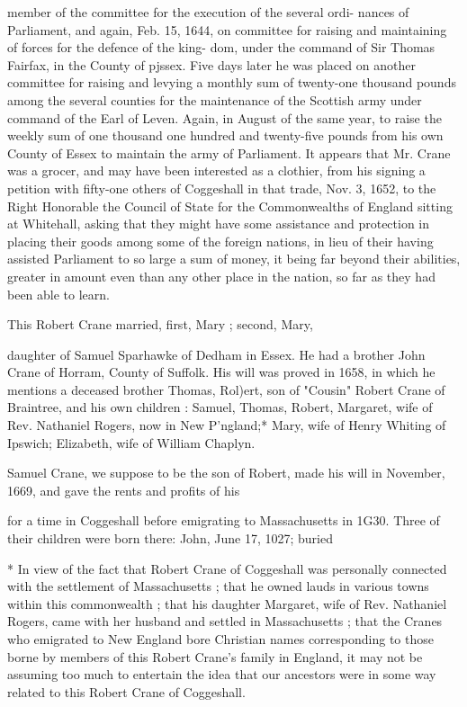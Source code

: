 \documentclass[oneside]{book}
\begin{document}
member of the committee for the execution of the several ordi- 
nances of Parliament, and again, Feb. 15, 1644, on committee 
for raising and maintaining of forces for the defence of the king- 
dom, under the command of Sir Thomas Fairfax, in the County 
of pjssex. Five days later he was placed on another committee 
for raising and levying a monthly sum of twenty-one thousand 
pounds among the several counties for the maintenance of the 
Scottish army under command of the Earl of Leven. Again, in 
August of the same year, to raise the weekly sum of one thousand 
one hundred and twenty-five pounds from his own County of 
Essex to maintain the army of Parliament. It appears that Mr. 
Crane was a grocer, and may have been interested as a clothier, 
from his signing a petition with fifty-one others of Coggeshall in 
that trade, Nov. 3, 1652, to the Right Honorable the Council of 
State for the Commonwealths of England sitting at Whitehall, 
asking that they might have some assistance and protection in 
placing their goods among some of the foreign nations, in lieu of 
their having assisted Parliament to so large a sum of money, it 
being far beyond their abilities, greater in amount even than any 
other place in the nation, so far as they had been able to learn. 

This Robert Crane married, first, Mary ; second, Mary, 

daughter of Samuel Sparhawke of Dedham in Essex. He had a 
brother John Crane of Horram, County of Suffolk. His will was 
proved in 1658, in which he mentions a deceased brother Thomas, 
Rol)ert, son of "Cousin" Robert Crane of Braintree, and his own 
children : Samuel, Thomas, Robert, Margaret, wife of Rev. 
Nathaniel Rogers, now in New P'ngland;* Mary, wife of Henry 
Whiting of Ipswich; Elizabeth, wife of William Chaplyn. 

Samuel Crane, we suppose to be the son of Robert, made his 
will in November, 1669, and gave the rents and profits of his 



for a time in Coggeshall before emigrating to Massachusetts in 1G30. 
Three of their children were born there: John, June 17, 1027; buried 

* In view of the fact that Robert Crane of Coggeshall was personally 
connected with the settlement of Massachusetts ; that he owned lauds in 
various towns within this commonwealth ; that his daughter Margaret, 
wife of Rev. Nathaniel Rogers, came with her husband and settled in 
Massachusetts ; that the Cranes who emigrated to New England bore 
Christian names corresponding to those borne by members of this 
Robert Crane's family in England, it may not be assuming too much to 
entertain the idea that our ancestors were in some way related to this 
Robert Crane of Coggeshall. 
\end{document}
